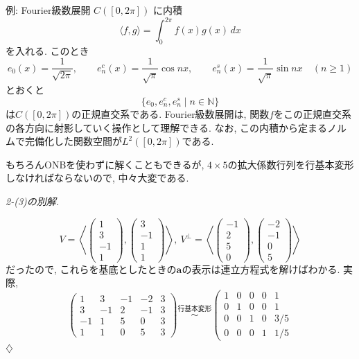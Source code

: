 \documentclass[titlepage]{jsarticle}
\numberwithin{equation}{section}
\newcommand{\N}{\mathbb{N}}%
\newenvironment{kaitou}[1][解]{%
\begin{proofbox}%
\textit{#1. }\ignorespaces
}{%
\hfill$\diamondsuit$%
\end{proofbox}%
}
\begin{document}
\begin{lem}{例: Fourier級数展開}
$C([0, 2\pi])$ に内積
\[
\langle f,g\rangle
=
\int_{0}^{2\pi} f(x)g(x)\,dx
\]
を入れる. このとき
\[
e_0(x)=\frac{1}{\sqrt{2\pi}},
\qquad
e_n^c(x)=\frac{1}{\sqrt{\pi}}\cos nx,
\qquad
e_n^s(x)=\frac{1}{\sqrt{\pi}}\sin nx
\quad(n\geq 1)
\]
とおくと
\[
\{e_0,e_n^c,e_n^s \mid n \in \N\}
\]
は$C([0,2\pi])$の正規直交系である. Fourier級数展開は, 関数$f$をこの正規直交系の各方向に射影していく操作として理解できる. なお, この内積から定まるノルムで完備化した関数空間が$L^2([0, 2\pi])$である.
\end{lem}
もちろんONBを使わずに解くこともできるが, $4\times5$の拡大係数行列を行基本変形しなければならないので, 中々大変である.
\begin{kaitou}[2-(3)の別解]
\[
V = \left\langle
\begin{pmatrix}
1\\
3\\
-1\\
1
\end{pmatrix}
,
\begin{pmatrix}
3\\
-1\\
1\\
1
\end{pmatrix}
\right\rangle
,\:
V^\perp=
\left\langle
\begin{pmatrix}
-1\\
2\\
5\\
0
\end{pmatrix}
,
\begin{pmatrix}
-2\\
-1\\
0\\
5
\end{pmatrix}
\right\rangle
\]
だったので, これらを基底としたときの$\bm{a}$の表示は連立方程式を解けばわかる. 実際,
\[
\left(
\begin{array}{cccc|c}
1 & 3 & -1 & -2 & 3\\
3 & -1 & 2 & -1 & 3\\
-1 & 1 & 5 & 0 & 3\\
1 & 1 & 0 & 5 & 3
\end{array}
\right)
\overset{\text{行基本変形}}{\sim}
\left(
\begin{array}{cccc|c}
1 & 0 & 0 & 0 & 1\\
0 & 1 & 0 & 0 & 1\\
0 & 0 & 1 & 0 & 3/5\\
0 & 0 & 0 & 1 & 1/5
\end{array}
\]
\end{kaitou}
\end{document}
